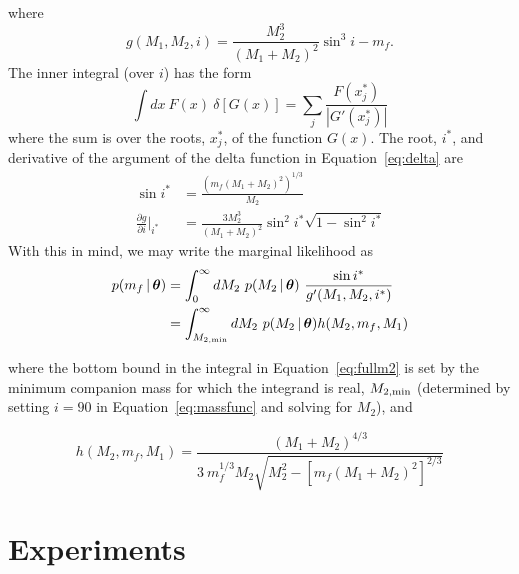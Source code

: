 \documentclass[apjl]{emulateapj}
\newcommand{\given}{\,|\,}
\newcommand{\bs}[1]{\boldsymbol{#1}}
\begin{document}
where
\begin{equation}
	g(M_1,M_2,i) = \frac{M_2^3}{(M_1+M_2)^2}\sin^3 i - m_f.
\end{equation}
The inner integral (over $i$) has the form
\begin{equation}
    \int dx~F(x)~\delta \left[ G(x) \right] = \sum_j \frac{F(x^*_j)}{|G'(x^*_j)|}
\end{equation}
where the sum is over the roots, $x^*_j$, of the function $G(x)$. The root, $i^*$, and derivative of the argument of the delta function in Equation~\ref{eq:delta} are 
\begin{align}
	\sin i^* &= \frac{(m_f(M_1+M_2)^2)^{1/3}}{M_2}\\
	\frac{\partial g}{\partial i}\bigg\rvert_{i^*} &= \frac{3M_2^3}{(M_1+M_2)^2} \sin^2 i^* \sqrt{1 - \sin^2 i^*}
\end{align}
With this in mind, we may write the marginal likelihood as
\begin{align}
	p(m_f \given \bs{\theta}) &= \int_{0}^\infty dM_2~p(M_2 \given \bs{\theta})~\frac{\sin i^*}{g'(M_1,M_2,i^*)}\\
	&= \int_{M_{2,{\rm min}}}^\infty dM_2~p(M_2 \given \bs{\theta}) h(M_2, m_f, M_1) \label{eq:fullm2}
\end{align}

where the bottom bound in the integral in Equation~\ref{eq:fullm2} is set by the minimum companion mass for which the integrand is real, $M_{2,{\rm min}}$ (determined by setting $i=90$ in Equation~\ref{eq:massfunc} and solving for $M_2$), and

\begin{equation}
h(M_2, m_f, M_1) = \frac{(M_1+M_2)^{4/3}}{3\ m_f^{1/3}M_2\sqrt{M_2^2 - \left[ m_f(M_1+M_2)^2 \right]^{2/3}}}
\end{equation}



\section{Experiments} \label{sec:experiments}
\end{document}
